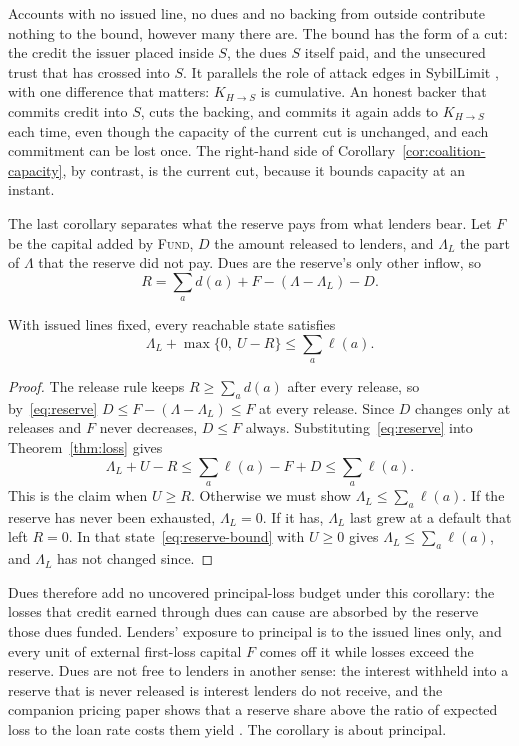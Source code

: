 \documentclass[acmsmall,nonacm,screen]{acmart}
\theoremstyle{acmdefinition}%
\newcommand{\Op}[1]{\textsc{#1}}
\begin{document}
Accounts with no issued line, no dues and no backing from outside contribute nothing to the bound,
however many there are. The bound has the form of a cut: the credit the issuer placed inside $S$,
the dues $S$ itself paid, and the unsecured trust that has crossed into $S$. It parallels the role of
attack edges in SybilLimit \citep{yu2008sybillimit}, with one difference that matters: $K_{H\to S}$ is
cumulative. An honest backer that commits credit into $S$, cuts the backing, and commits it again
adds to $K_{H\to S}$ each time, even though the capacity of the current cut is unchanged, and each
commitment can be lost once. The right-hand side of Corollary~\ref{cor:coalition-capacity}, by
contrast, is the current cut, because it bounds capacity at an instant.

The last corollary separates what the reserve pays from what lenders bear. Let $F$ be the capital
added by \Op{Fund}, $D$ the amount released to lenders, and $\Lambda_L$ the part of $\Lambda$ that
the reserve did not pay. Dues are the reserve's only other inflow, so
\begin{equation}\label{eq:reserve}
  R=\sum_a d(a)+F-(\Lambda-\Lambda_L)-D.
\end{equation}

\begin{corollary}\label{cor:reserve}
With issued lines fixed, every reachable state satisfies
\[
  \Lambda_L+\max\{0,\ U-R\}\le\sum_a\ell(a).
\]
\end{corollary}

\begin{proof}
The release rule keeps $R\ge\sum_ad(a)$ after every release, so by~\eqref{eq:reserve}
$D\le F-(\Lambda-\Lambda_L)\le F$ at every release. Since $D$ changes only at releases and $F$ never
decreases, $D\le F$ always. Substituting~\eqref{eq:reserve} into Theorem~\ref{thm:loss} gives
\begin{equation}\label{eq:reserve-bound}
  \Lambda_L+U-R\le\sum_a\ell(a)-F+D\le\sum_a\ell(a).
\end{equation}
This is the claim when $U\ge R$. Otherwise we must show $\Lambda_L\le\sum_a\ell(a)$. If the reserve
has never been exhausted, $\Lambda_L=0$. If it has, $\Lambda_L$ last grew at a default that left
$R=0$. In that state~\eqref{eq:reserve-bound} with $U\ge0$ gives $\Lambda_L\le\sum_a\ell(a)$, and
$\Lambda_L$ has not changed since.
\end{proof}

Dues therefore add no uncovered principal-loss budget under this corollary: the losses that credit
earned through dues can cause are absorbed by the reserve those dues funded. Lenders' exposure to
principal is to the issued lines only, and every unit of external first-loss capital $F$ comes off it
while losses exceed the reserve. Dues are not free to lenders in another sense: the interest withheld
into a reserve that is never released is interest lenders do not receive, and the companion pricing
paper shows that a reserve share above the ratio of expected loss to the loan rate costs them yield
\citep{pricingreserve2026}. The corollary is about principal.
\end{document}
